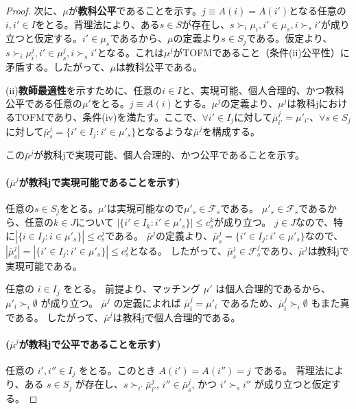 \documentclass[12pt, a4paper]{article}
\theoremstyle{definition}
\theoremstyle{remark}
\theoremstyle{plain}
\begin{document}
\begin{proof}
次に、$\mu$が\textbf{教科公平}であることを示す。$j \equiv A(i) = A(i')$となる任意の$i,i' \in I$をとる。背理法により、ある$s \in S$が存在し、$s \succ_i \mu_i, i' \in \mu_s, i \succ_s i'$が成り立つと仮定する。$i' \in \mu_s$であるから、$\mu$の定義より$s \in S_j$である。仮定より、$s \succ_i \mu^j_i, i' \in \mu^j_s, i \succ_s i'$となる。これは$\mu^j$がTOFMであること（条件(ii)公平性）に矛盾する。したがって、$\mu$は教科公平である。


(ii)\textbf{教師最適性}を示すために、任意の$i \in I$と、実現可能、個人合理的、かつ教科公平である任意の$\mu'$をとる。$j \equiv A(i)$とする。$\mu^j$の定義より、$\mu^j$は教科jにおけるTOFMであり、条件(iv)を満たす。ここで、$\forall i' \in I_j$に対して$\bar{\mu}^j_{i'} = \mu'_{i'}$、$\forall s \in S_j$に対して$\bar{\mu}^j_s = \{ i' \in I_j : i' \in \mu'_s\}$となるような$\bar{\mu}^j$を構成する。

この$\bar{\mu}^j$が教科jで実現可能、個人合理的、かつ公平であることを示す。

\paragraph{($\bar{\mu}^j$が教科jで実現可能であることを示す)}
任意の$s \in S_j$をとる。$\mu'$は実現可能なので$\mu'_s \in \mathcal{F}_s$である。
$\mu'_s \in \mathcal{F}_s$であるから、任意の$k \in J$について $|\{i' \in I_k : i' \in \mu'_s\}| \leq c^k_s$が成り立つ。
$j \in J$なので、特に$|\{i \in I_j : i \in \mu'_s\}| \leq c^j_s$である。
$\bar{\mu}^j$の定義より、$\bar{\mu}^j_s = \{ i' \in I_j : i' \in \mu'_s\}$なので、
$|\bar{\mu}^j_s| = |\{ i' \in I_j : i' \in \mu'_s\}| \leq c^j_s$となる。
したがって、$\bar{\mu}^j_s \in \mathcal{F}^j_s$であり、$\bar{\mu}^j$は教科jで実現可能である。

任意の $i \in I_j$ をとる。
前提より、マッチング $\mu'$ は個人合理的であるから、$\mu'_{i} \succ_{i} \emptyset$ が成り立つ。
$\bar{\mu}^j$ の定義によれば $\bar{\mu}^j_{i} = \mu'_{i}$ であるため、$\bar{\mu}^j_{i} \succ_{i} \emptyset$ もまた真である。
したがって、$\bar{\mu}^j$は教科jで個人合理的である。

\paragraph{($\bar{\mu}^j$が教科jで公平であることを示す)}
任意の $i', i'' \in I_j$ をとる。このとき $A(i')=A(i'')=j$ である。
背理法により、ある $s \in S_j$ が存在し、$s \succ_{i'} \bar{\mu}^j_{i'}$, $i'' \in \bar{\mu}^j_s$, かつ $i' \succ_s i''$ が成り立つと仮定する。


\end{proof}
\end{document}
